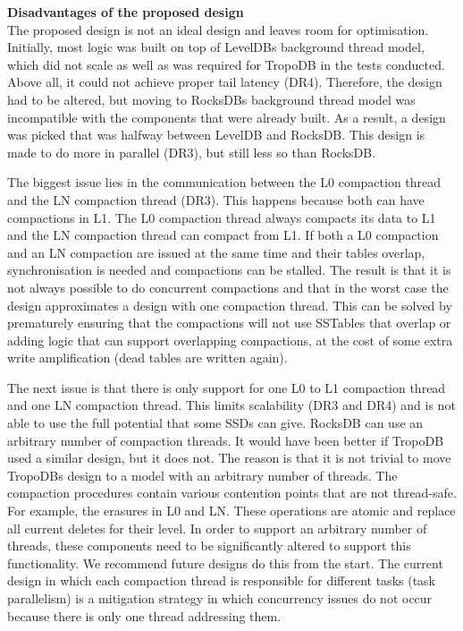 \textbf{Disadvantages of the proposed design}\\
The proposed design is not an ideal design and leaves room for optimisation. Initially, most logic was built on top of LevelDBs background thread model, which did not scale as well as was required for TropoDB in the tests conducted. Above all, it could not achieve proper tail latency (DR4). Therefore, the design had to be altered, but moving to RocksDBs background thread model was incompatible with the components that were already built. As a result, a design was picked that was halfway between LevelDB and RocksDB. This design is made to do more in parallel (DR3), but still less so than RocksDB. 

The biggest issue lies in the communication between the L0 compaction thread and the LN compaction thread (DR3). This happens because both can have compactions in L1. The L0 compaction thread always compacts its data to L1 and the LN compaction thread can compact from L1. If both a L0 compaction and an LN compaction are issued at the same time and their tables overlap, synchronisation is needed and compactions can be stalled. The result is that it is not always possible to do concurrent compactions and that in the worst case the design approximates a design with one compaction thread. This can be solved by prematurely ensuring that the compactions will not use SSTables that overlap or adding logic that can support overlapping compactions, at the cost of some extra write amplification (dead tables are written again).

The next issue is that there is only support for one L0 to L1 compaction thread and one LN compaction thread. This limits scalability (DR3 and DR4) and is not able to use the full potential that some SSDs can give. RocksDB can use an arbitrary number of compaction threads. It would have been better if TropoDB used a similar design, but it does not. The reason is that it is not trivial to move TropoDBs design to a model with an arbitrary number of threads. The compaction procedures contain various contention points that are not thread-safe. For example, the erasures in L0 and LN. These operations are atomic and replace all current deletes for their level. In order to support an arbitrary number of threads, these components need to be significantly altered to support this functionality. We recommend future designs do this from the start. The current design in which each compaction thread is responsible for different tasks (task parallelism) is a mitigation strategy in which concurrency issues do not occur because there is only one thread addressing them. 

